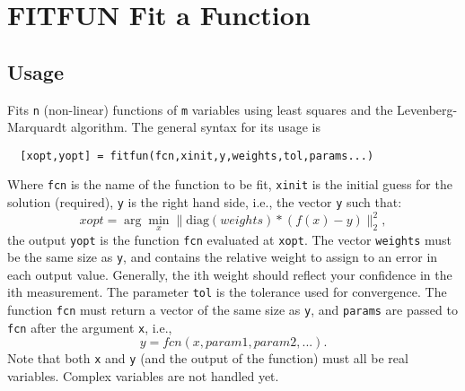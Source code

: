 \section{FITFUN Fit a Function}

\subsection{Usage}

Fits \verb|n| (non-linear) functions of \verb|m| variables using least squares
and the Levenberg-Marquardt algorithm.  The general syntax for its usage
is
\begin{verbatim}
  [xopt,yopt] = fitfun(fcn,xinit,y,weights,tol,params...)
\end{verbatim}
Where \verb|fcn| is the name of the function to be fit, \verb|xinit| is the
initial guess for the solution (required), \verb|y| is the right hand side,
i.e., the vector \verb|y| such that:
\[
   xopt = \arg \min_{x} \|\mathrm{diag}(weights)*(f(x) - y)\|_2^2,
\]
the output \verb|yopt| is the function \verb|fcn| evaluated at \verb|xopt|.  
The vector \verb|weights| must be the same size as \verb|y|, and contains the
relative weight to assign to an error in each output value.  Generally,
the ith weight should reflect your confidence in the ith measurement.
The parameter \verb|tol| is the tolerance used for convergence.
The function \verb|fcn| must return a vector of the same size as \verb|y|,
and \verb|params| are passed to \verb|fcn| after the argument \verb|x|, i.e.,
\[
  y = fcn(x,param1,param2,...).
\]
Note that both \verb|x| and \verb|y| (and the output of the function) must all
be real variables.  Complex variables are not handled yet.
